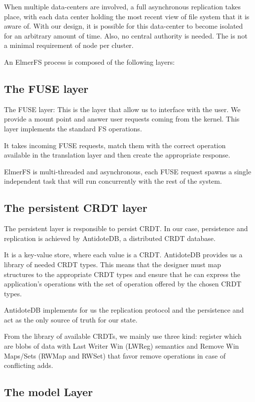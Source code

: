 \documentclass[sigplan, 10pt]{acmart}
\begin{document}
When multiple data-centers are involved, a full asynchronous replication takes
place, with each data center holding the most recent view of file system
that it is aware of. With our design, it is possible for this data-center
to become isolated for an arbitrary amount of time. Also, no central authority
is needed. The is not a minimal requirement of node per cluster.

An ElmerFS process is composed of the following layers:

\subsection{The FUSE layer}

The FUSE layer: This is the layer that allow us to interface with the
user. We provide a mount point and answer user requests coming from the
kernel. This layer implements the standard FS operations.

It takes incoming FUSE requests, match them with the correct operation
available in the translation layer and then create the appropriate response.

ElmerFS is multi-threaded and asynchronous, each FUSE request spawns
a single independent task that will run concurrently with the rest of the
system.

\subsection{The persistent CRDT layer}

The persistent layer is responsible to persist CRDT.
In our case, persistence and replication is achieved by AntidoteDB, a
distributed CRDT database.

It is a key-value store, where each value is a CRDT. AntidoteDB provides
us a library of needed CRDT types.
This means that the designer must map structures to the appropriate CRDT types
and ensure that he can express the application's operations
with the set of operation offered by the chosen CRDT types.

AntidoteDB implements for us the replication protocol and the persistence and
act as the only source of truth for our state.

From the library of available CRDTs, we mainly use three kind:
register which are blobs of data with Last Writer Win (LWReg) semantics and
Remove Win Maps/Sets (RWMap and RWSet) that favor remove operations
in case of conflicting adds.

\subsection{The model Layer}
\end{document}

